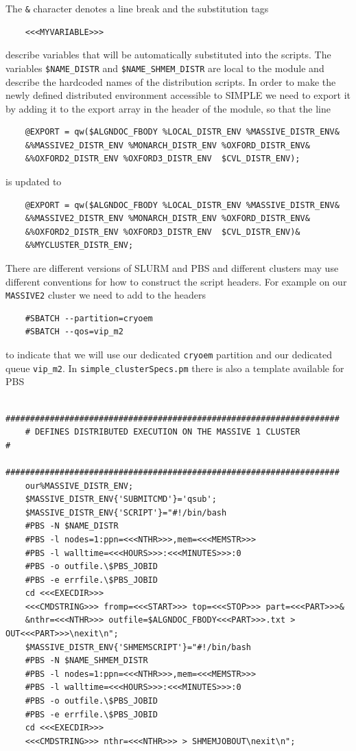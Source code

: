 \documentclass[a4paper,11pt]{article}
\begin{document}
The \texttt{\&} character denotes a line break and the substitution tags
\begin{verbatim}
    <<<MYVARIABLE>>>
\end{verbatim}
describe variables that will be automatically substituted into the scripts. The variables \texttt{\$NAME\_DISTR} and \texttt{\$NAME\_SHMEM\_DISTR} are local to the module and describe the hardcoded names of the distribution scripts. In order to make the newly defined distributed environment accessible to SIMPLE we need to export it by adding it to the export array in the header of the module, so that the line
\begin{verbatim}
    @EXPORT = qw($ALGNDOC_FBODY %LOCAL_DISTR_ENV %MASSIVE_DISTR_ENV&
    &%MASSIVE2_DISTR_ENV %MONARCH_DISTR_ENV %OXFORD_DISTR_ENV&
    &%OXFORD2_DISTR_ENV %OXFORD3_DISTR_ENV  $CVL_DISTR_ENV);
\end{verbatim}
is updated to
\begin{verbatim}
    @EXPORT = qw($ALGNDOC_FBODY %LOCAL_DISTR_ENV %MASSIVE_DISTR_ENV&
    &%MASSIVE2_DISTR_ENV %MONARCH_DISTR_ENV %OXFORD_DISTR_ENV&
    &%OXFORD2_DISTR_ENV %OXFORD3_DISTR_ENV  $CVL_DISTR_ENV)&
    &%MYCLUSTER_DISTR_ENV;
\end{verbatim}
There are different versions of SLURM and PBS and different clusters may use different conventions for how to construct the script headers. For example on our \texttt{MASSIVE2} cluster we need to add to the headers
\begin{verbatim}
    #SBATCH --partition=cryoem
    #SBATCH --qos=vip_m2
\end{verbatim}
to indicate that we will use our dedicated \texttt{cryoem} partition and our dedicated queue \texttt{vip\_m2}. In \texttt{simple\_clusterSpecs.pm} there is also a template available for PBS
\begin{verbatim}
    ####################################################################
    # DEFINES DISTRIBUTED EXECUTION ON THE MASSIVE 1 CLUSTER           #
    ####################################################################
    our%MASSIVE_DISTR_ENV;
    $MASSIVE_DISTR_ENV{'SUBMITCMD'}='qsub';
    $MASSIVE_DISTR_ENV{'SCRIPT'}="#!/bin/bash
    #PBS -N $NAME_DISTR
    #PBS -l nodes=1:ppn=<<<NTHR>>>,mem=<<<MEMSTR>>>
    #PBS -l walltime=<<<HOURS>>>:<<<MINUTES>>>:0
    #PBS -o outfile.\$PBS_JOBID
    #PBS -e errfile.\$PBS_JOBID
    cd <<<EXECDIR>>> 
    <<<CMDSTRING>>> fromp=<<<START>>> top=<<<STOP>>> part=<<<PART>>>&
    &nthr=<<<NTHR>>> outfile=$ALGNDOC_FBODY<<<PART>>>.txt > OUT<<<PART>>>\nexit\n";
    $MASSIVE_DISTR_ENV{'SHMEMSCRIPT'}="#!/bin/bash
    #PBS -N $NAME_SHMEM_DISTR
    #PBS -l nodes=1:ppn=<<<NTHR>>>,mem=<<<MEMSTR>>>
    #PBS -l walltime=<<<HOURS>>>:<<<MINUTES>>>:0
    #PBS -o outfile.\$PBS_JOBID
    #PBS -e errfile.\$PBS_JOBID
    cd <<<EXECDIR>>> 
    <<<CMDSTRING>>> nthr=<<<NTHR>>> > SHMEMJOBOUT\nexit\n";
\end{verbatim}
\end{document}

